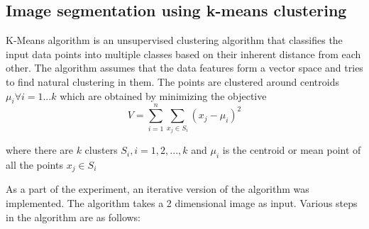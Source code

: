 \documentclass[conference]{IEEEtran}
\begin{document}
\subsection{Image segmentation using k-means clustering}
K-Means algorithm is an unsupervised clustering algorithm that classifies the input data points into multiple classes based on their inherent distance from each other. The algorithm assumes that the data features form a vector space and tries to find natural clustering in them. The points are clustered around centroids \begin{math}\mu_{i} \forall i = 1...k\end{math} which are obtained by minimizing the objective
\begin{equation}
	V = \sum\limits_{i=1}^n \sum\limits_{x_{j}\in S_{i}} (x_{j} - \mu_{i})^2
\end{equation}

where there are \begin{math}k\end{math} clusters \begin{math} S_{i},i=1,2,...,k \end{math} and \begin{math} \mu_{i} \end{math} is the centroid or mean point of all the points \begin{math}x_{j} \in S_{i}\end{math} 

As a part of the experiment, an iterative version of the algorithm was implemented. The algorithm takes a 2 dimensional image as input. Various steps in the algorithm are as follows:
\end{document}
